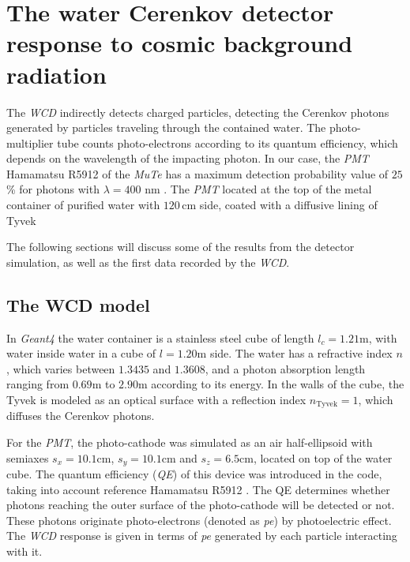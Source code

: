 \documentclass[submitting]{nst}
\begin{document}
\section{The water Cerenkov detector response to cosmic background radiation}
\label{sec:wcd-response}
The \textsl{WCD} indirectly detects charged particles, detecting the Cerenkov photons generated by particles traveling through the contained water. The photo-multiplier tube counts photo-electrons according to its quantum efficiency, which depends on the wavelength of the impacting photon.  In our case, the \textsl{PMT} Hamamatsu R5912 of the \textsl{MuTe} has a maximum detection probability value of $25$\% for photons with $\lambda = 400$ nm \cite{Hamamatsu2018}. The \textsl{PMT} located at the top of the metal container of purified water with $120$\,cm side, coated with a diffusive lining of Tyvek 

The following sections will discuss some of the results from the detector simulation, as well as the first data recorded by the  \textsl{WCD}.

\subsection{The WCD model}\label{sec:wcd-model}
 In \textsl{Geant4} the water container is a stainless steel cube of length $l_c=1.21$m, with water inside water in a cube of $ l=1.20$m side. The water has a refractive index $n$, which varies between $1.3435$ and $1.3608$, and a photon absorption length ranging from $0.69$m to $2.90$m according to its energy. In the walls of the cube, the Tyvek is modeled as an optical surface with a reflection index $n_{\mathrm{Tyvek}} = 1 $, which diffuses the Cerenkov photons.

For the \textsl{PMT}, the photo-cathode was simulated as an air half-ellipsoid with semiaxes $s_x=10.1$cm, $ s_y = 10.1$cm and $s_z=6.5$cm, located on top of the water cube. The quantum efficiency (\textsl{QE}) of this device was introduced in the code, taking into account reference Hamamatsu R5912 \cite{Hamamatsu2018}. The QE determines whether photons reaching the outer surface of the photo-cathode will be detected or not. These photons originate photo-electrons (denoted as \textsl{pe}) by photoelectric effect. The \textsl{WCD} response  is given in terms of \textsl{pe} generated by each particle interacting with it.
\end{document}
